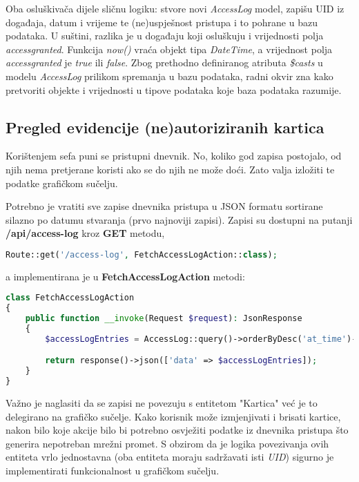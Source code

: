 Oba osluškivača dijele sličnu logiku: stvore novi \textit{AccessLog} model, zapišu UID iz događaja, datum i vrijeme te
(ne)uspješnost pristupa i to pohrane u bazu podataka.
U suštini, razlika je u događaju koji osluškuju i vrijednosti polja \textit{access\textunderscore granted}.
Funkcija \textit{now()} vraća objekt tipa \textit{DateTime}, a vrijednost polja \textit{access\textunderscore granted}
je \textit{true} ili \textit{false}.
Zbog prethodno definiranog atributa \textit{\$casts} u modelu \textit{AccessLog} prilikom spremanja u bazu podataka,
radni okvir zna kako pretvoriti objekte i vrijednosti u tipove podataka koje baza podataka razumije.

\subsection{Pregled evidencije (ne)autoriziranih kartica}

Korištenjem sefa puni se pristupni dnevnik.
No, koliko god zapisa postojalo, od njih nema pretjerane koristi ako se do njih ne može doći.
Zato valja izložiti te podatke grafičkom sučelju.

Potrebno je vratiti sve zapise dnevnika pristupa u JSON formatu sortirane silazno po datumu stvaranja (prvo najnoviji zapisi).
Zapisi su dostupni na putanji \textbf{/api/access-log} kroz \textbf{GET} metodu,

\begin{lstlisting}[language=PHP]
Route::get('/access-log', FetchAccessLogAction::class);
\end{lstlisting}

a implementirana je u \textbf{FetchAccessLogAction} metodi:

\begin{lstlisting}[language=PHP]
class FetchAccessLogAction
{
    public function __invoke(Request $request): JsonResponse
    {
        $accessLogEntries = AccessLog::query()->orderByDesc('at_time')->get();

        return response()->json(['data' => $accessLogEntries]);
    }
}
\end{lstlisting}

Važno je naglasiti da se zapisi ne povezuju s entitetom "Kartica" već je to delegirano na grafičko sučelje.
Kako korisnik može izmjenjivati i brisati kartice, nakon bilo koje akcije bilo bi potrebno osvježiti podatke iz dnevnika
pristupa što generira nepotreban mrežni promet.
S obzirom da je logika povezivanja ovih entiteta vrlo jednostavna (oba entiteta moraju sadržavati isti \textit{UID})
sigurno je implementirati funkcionalnost u grafičkom sučelju.
